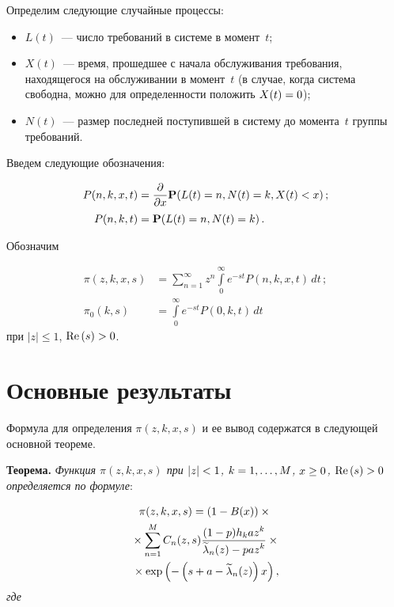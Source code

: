 \begin{multicols}{2}
Определим следующие случайные процессы:
\begin{itemize}
\item $L(t)$~--- число требований в системе в момент~$t$;
\item
$X(t)$~--- время, прошедшее с начала обслуживания требования,
находящегося на обслуживании в момент~$t$ (в случае, когда
система свободна, можно для определенности положить $X(t)\hm=0$);
\item
$N(t)$~--- размер последней поступившей в систему до момента~$t$
группы требований.
\end{itemize}

Введем следующие обозначения:

\noindent
\begin{align*}
P(n,k,x,t)&=\displaystyle\frac{\displaystyle \partial\mathstrut}{\displaystyle \partial x\mathstrut}\mathbf{P}(L(t)=n,N(t)=k,X(t)<x)\,;\\
P(n,k,t)&=\mathbf{P}(L(t)=n,N(t)=k)\,.
\end{align*}

Обозначим

\noindent
\begin{align*}
\pi(z,k,x,s)&=\sum\limits_{n=1}^{\infty}z^n\int\limits_0^{\infty}e^{-st}
P(n,k,x,t)\,dt\,;\\
\pi_0(k,s)&=\int\limits_0^{\infty}e^{-st} P(0,k,t)\,dt
\end{align*}
при $|z|\leq1$, $\Re(s)\hm>0$.

\vspace*{-4pt}

\section{Основные результаты}

Формула для определения $\pi(z,k,x,s)$ и ее вывод содержатся в
следующей основной теореме.

\smallskip

\noindent
\textbf{Теорема.}
\textit{Функция $\pi(z,k,x,s)$ при $|z|\hm<1$, $k\hm=1,\ldots,M$, $x\hm\geq 0$,
$\Re(s)\hm>0$ определяется по формуле}:

\noindent
\begin{multline*}
\pi(z,k,x,s)=(1-B(x))\times{}\\
{}\times \sum\limits_{n=1}^{M}C_n(z,s)
\displaystyle\frac{\displaystyle (1-p)h_k az^k\mathstrut}{\displaystyle \widetilde{\lambda}_n(z)-paz^k\mathstrut}
\times{}\\
{}\times \exp\left(-\left(
s+a-\widetilde{\lambda}_n(z)\right)x\right),
\end{multline*}
\textit{где}


\end{multicols}
